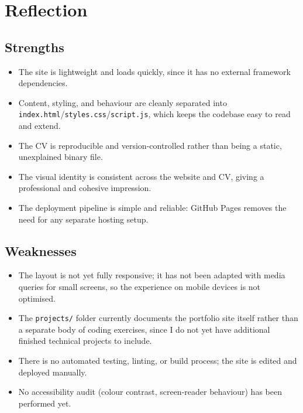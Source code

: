 \documentclass[11pt,a4paper]{article}
\begin{document}
\section{Reflection}

\subsection{Strengths}
\begin{itemize}
  \item The site is lightweight and loads quickly, since it has no external framework
        dependencies.
  \item Content, styling, and behaviour are cleanly separated into
        \texttt{index.html}/\texttt{styles.css}/\texttt{script.js}, which keeps the codebase easy
        to read and extend.
  \item The CV is reproducible and version-controlled rather than being a static, unexplained
        binary file.
  \item The visual identity is consistent across the website and CV, giving a professional and
        cohesive impression.
  \item The deployment pipeline is simple and reliable: GitHub Pages removes the need for any
        separate hosting setup.
\end{itemize}

\subsection{Weaknesses}
\begin{itemize}
  \item The layout is not yet fully responsive; it has not been adapted with media queries for
        small screens, so the experience on mobile devices is not optimised.
  \item The \texttt{projects/} folder currently documents the portfolio site itself rather than a
        separate body of coding exercises, since I do not yet have additional finished technical
        projects to include.
  \item There is no automated testing, linting, or build process; the site is edited and deployed
        manually.
  \item No accessibility audit (colour contrast, screen-reader behaviour) has been performed yet.
\end{itemize}
\end{document}

